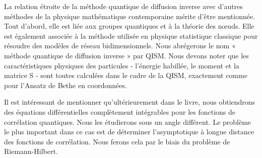 La relation étroite de la méthode quantique de diffusion inverse avec d'autres méthodes de la physique mathématique contemporaine mérite d'être mentionnée. Tout d'abord, elle est liée aux groupes quantiques et à la théorie des nœuds. Elle est également associée à la méthode utilisée en physique statistique classique pour résoudre des modèles de réseau bidimensionnels. Nous abrégerons le nom « méthode quantique de diffusion inverse » par QISM. Nous devons noter que les caractéristiques physiques des particules - l'énergie habillée, le moment et la matrice S - sont toutes calculées dans le cadre de la QISM, exactement comme pour l'Ansatz de Bethe en coordonnées.

Il est intéressant de mentionner qu'ultérieurement dans le livre, nous obtiendrons des équations différentielles complètement intégrables pour les fonctions de corrélation quantiques. Nous les étudierons sous un angle différent. Le problème le plus important dans ce cas est de déterminer l'asymptotique à longue distance des fonctions de corrélation. Nous ferons cela par le biais du problème de Riemann-Hilbert.
